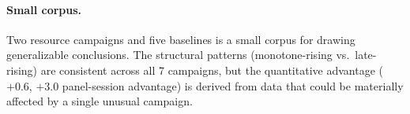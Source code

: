 \paragraph{Small corpus.}
Two resource campaigns and five baselines is a small corpus for drawing generalizable
conclusions. The structural patterns (monotone-rising vs.\ late-rising) are consistent
across all 7 campaigns, but the quantitative advantage ($+0.6$, $+3.0$ panel-session
advantage) is derived from data that could be materially affected by a single unusual
campaign.
